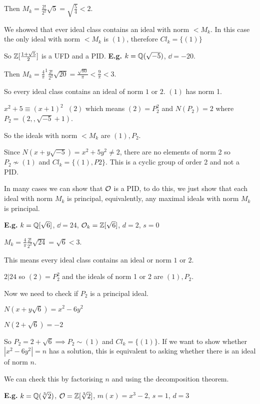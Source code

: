 \documentclass[11pt]{article}
\begin{document}
Then $M_k = \frac{2!}{2^2} \sqrt{5} = \sqrt{\frac54} < 2$.
\spa

We showed that ever ideal class contains an ideal with norm $< M_k$.
In this case the only ideal with norm $<M_k$ is $(1)$, therefore $Cl_k = \{(1)\}$

So $\mathbb{Z}[\frac{1+\sqrt{5}}2]$ is a UFD and a PID.
\spac
\textbf{E.g.} $k = \mathbb{Q}(\sqrt{-5}) $, $\dd=  -20$.
\spa

Then $M_k  = \frac{4}{\pi}^1 \frac{2!}{2^2} \sqrt{20} = \frac{\sqrt{80}}{\pi} < \frac9\pi < 3$.
\spa

So every ideal class contains an ideal of norm $1$ or $2$. 
$(1)$ has norm 1.
\spa

$x^2 + 5 \equiv (x+1)^2 \hspace{7pt} (2) $ which means $(2) = P_2^2 $ and $N(P_2) = 2$ where $P_2 = (2, ,\sqrt{-5} +1 )$.
\spa

So the ideals with norm $< M_k$ are $(1), P_2$.
\spa

Since $N(x+y\sqrt{-5}) = x^2+5y^2 \neq 2$, there are no elements of norm 2 so $P_2 \not \sim (1) $ and $Cl_k = \{(1) , P2\}$. This is a cyclic group of order 2 and not a PID.
\spa

In many cases we can show that $\mathcal{O}$ is a PID, to do this, we just show that each ideal with norm $M_k$ is principal, equivalently, any maximal ideals with norm $M_k$ is principal.

\spac
\textbf{E.g.} $k = \mathbb{Q}[\sqrt{6}]$, $\dd = 24$, $\mathcal{O}_k = \mathbb{Z}[\sqrt6]$, $d=2$, $s=0$
\spa

$M_k = \frac{4}{\pi} \frac{2!}{2^2} \sqrt{24} = \sqrt{6} < 3$.
\spa

This means every ideal class contains an ideal or norm $1$ or $2$.
\spa

$2 | 24$ so $(2) = P_2^2$ and the ideals of norm 1 or 2 are $(1), P_2$.
\spa

Now we need to check if $P_2$ is a principal ideal.
\spa

$N(x+y\sqrt6) = x^2 - 6y^2 $

$N(2+\sqrt6 ) = -2$

So $P_2 = 2+ \sqrt6 \implies P_2 \sim (1)$ and $Cl_k = \{ (1)\}$.
\spac
If we want to show whether $|x^2 - 6y^2  | = n$ has a solution, this is equivalent to asking whether there is an ideal of norm $n$.

We can check this by factorising $n$ and using the decomposition theorem.

\spac
\textbf{E.g.} $k = \mathbb{Q}(\sqrt[3]2) $, $\mathcal{O} = \mathbb{Z}[\sqrt[3]2] $, $m(x) = x^3 -2 $, $s=1$, $d=3$  
\spa
\end{document}
